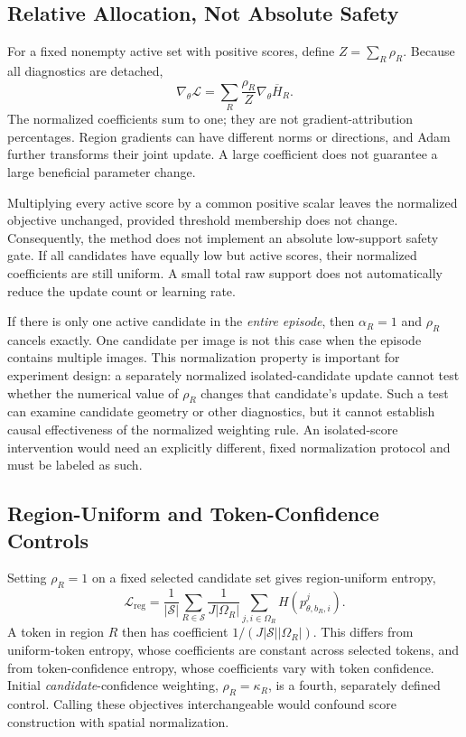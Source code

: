 \subsection{Relative Allocation, Not Absolute Safety}
For a fixed nonempty active set with positive scores, define $Z=\sum_R\rho_R$. Because all diagnostics are detached,
\begin{equation}
\nabla_\theta\mathcal L
=\sum_R\frac{\rho_R}{Z}\nabla_\theta\overline H_R.
\end{equation}
The normalized coefficients sum to one; they are not gradient-attribution percentages. Region gradients can have different norms or directions, and Adam further transforms their joint update. A large coefficient does not guarantee a large beneficial parameter change.

Multiplying every active score by a common positive scalar leaves the normalized objective unchanged, provided threshold membership does not change. Consequently, the method does not implement an absolute low-support safety gate. If all candidates have equally low but active scores, their normalized coefficients are still uniform. A small total raw support does not automatically reduce the update count or learning rate.

If there is only one active candidate in the \emph{entire episode}, then $\alpha_R=1$ and $\rho_R$ cancels exactly. One candidate per image is not this case when the episode contains multiple images. This normalization property is important for experiment design: a separately normalized isolated-candidate update cannot test whether the numerical value of $\rho_R$ changes that candidate's update. Such a test can examine candidate geometry or other diagnostics, but it cannot establish causal effectiveness of the normalized weighting rule. An isolated-score intervention would need an explicitly different, fixed normalization protocol and must be labeled as such.

\subsection{Region-Uniform and Token-Confidence Controls}
Setting $\rho_R=1$ on a fixed selected candidate set gives region-uniform entropy,
\begin{equation}
\mathcal L_{\mathrm{reg}}=\frac{1}{|\mathcal S|}
\sum_{R\in\mathcal S}\frac{1}{J|\Omega_R|}
\sum_{j,i\in\Omega_R}H(p^j_{\theta,b_R,i}).
\end{equation}
A token in region $R$ then has coefficient $1/(J|\mathcal S||\Omega_R|)$. This differs from uniform-token entropy, whose coefficients are constant across selected tokens, and from token-confidence entropy, whose coefficients vary with token confidence. Initial \emph{candidate}-confidence weighting, $\rho_R=\kappa_R$, is a fourth, separately defined control. Calling these objectives interchangeable would confound score construction with spatial normalization.

